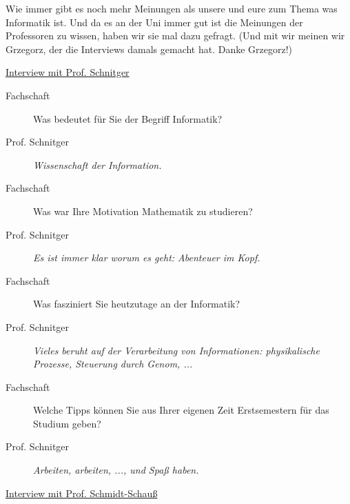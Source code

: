 \spaltenanfang
Wie immer gibt es noch mehr Meinungen als unsere und eure zum Thema was Informatik ist.
Und da es an der Uni immer gut ist die Meinungen der Professoren zu wissen, haben wir sie mal dazu gefragt.
(Und mit wir meinen wir Grzegorz, der die Interviews damals gemacht hat. Danke Grzegorz!)

\begin{flushleft}\underline{Interview mit Prof. Schnitger} \end{flushleft}

\begin{description}

\item[Fachschaft] 

Was bedeutet für Sie der Begriff Informatik?

\item[Prof. Schnitger]
 
\textit{Wissenschaft der Information.}

\item[Fachschaft]

Was war Ihre Motivation Mathematik zu studieren?

\item[Prof. Schnitger]

\textit{Es ist immer klar worum es geht: Abenteuer im Kopf.}

\item[Fachschaft]

Was fasziniert Sie heutzutage an der Informatik?

\item[Prof. Schnitger]

\textit{Vieles beruht auf der Verarbeitung von Informationen: physikalische Prozesse, Steuerung durch Genom, ...}

\item[Fachschaft]

Welche Tipps können Sie aus Ihrer eigenen Zeit Erstsemestern für das Studium geben?

\item[Prof. Schnitger]

\textit{Arbeiten, arbeiten, ..., und Spaß haben.}

\end{description}



\begin{flushleft}\underline{Interview mit Prof. Schmidt-Schauß} \end{flushleft}

